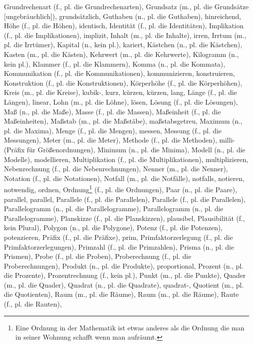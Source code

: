 Grundrechenart (f., pl. die Grundrechenarten),
Grundsatz (m., pl. die Grundsätze [ungebräuchlich]),
grundsätzlich,
Guthaben (n., pl. die Guthaben),
hinreichend,
Höhe (f., pl. die Höhen),
identisch,
Identität (f., pl. die Identitäten),
Implikation (f., pl. die Implikationen),
implizit,
Inhalt (m., pl. die Inhalte),
irren,
Irrtum (m., pl. die Irrtümer),
Kapital (n., kein pl.),
kariert,
Kästchen (n., pl. die Kästchen),
Kasten (m., pl. die Kästen),
Kehrwert (m., pl. die Kehrwerte),
Kilogramm (n., kein pl.),
Klammer (f., pl. die Klammern),
Komma (n., pl. die Kommata),
Kommunikation (f., pl. die Kommunikationen),
kommunizieren,
konstruieren,
Konstruktion (f., pl. die Konstruktionen),
Körperhöhe (f., pl. die Körperhöhen),
Kreis (m., pl. die Kreise),
kubik-,
kurz,
kürzen,
kürzen,
lang,
Länge (f., pl. die Längen),
linear,
Lohn (m., pl. die Löhne),
lösen,
Lösung (f., pl. die Lösungen),
Maß (n., pl. die Maße),
Masse (f., pl. die Massen),
Maßeinheit (f., pl. die Maßeinheiten),
Maßstab (m., pl. die Maßstäbe),
maßstabsgetreu,
Maximum (n., pl. die Maxima),
Menge (f., pl. die Mengen),
messen,
Messung (f., pl. die Messungen),
Meter (m., pl. die Meter),
Methode (f., pl. die Methoden),
milli- (Präfix für Größenordnungen),
Minimum (n., pl. die Minima),
Modell (n., pl. die Modelle),
modellieren,
Multiplikation (f., pl. die Multiplikationen),
multiplizieren,
Nebenrechnung (f., pl. die Nebenrechnungen),
Nenner (m., pl. die Nenner),
Notation (f., pl. die Notationen),
Notfall (m., pl. die Notfälle),
notfalls,
notieren,
notwendig,
ordnen,
Ordnung\footnote{Eine Ordnung in der Mathematik ist etwas anderes als die Ordnung die man in seiner Wohnung schafft wenn man aufräumt.} (f., pl. die Ordnungen),
Paar (n., pl. die Paare),
parallel,
parallel,
Parallele (f., pl. die Parallelen),
Parallele (f., pl. die Parallelen),
Parallelogramm (n., pl. die Parallelogramme),
Parallelogramm (n., pl. die Parallelogramme),
Planskizze (f., pl. die Planskizzen),
plausibel,
Plausibilität (f., kein Plural),
Polygon (n., pl. die Polygone),
Potenz (f., pl. die Potenzen),
potenzieren,
Präfix (f., pl. die Präfixe),
prim,
Primfaktorzerlegung (f., pl. die Primfaktorzerlegungen),
Primzahl (f., pl. die Primzahlen),
Prisma (n., pl. die Prismen),
Probe (f., pl. die Proben),
Proberechnung (f., pl. die Proberechnungen),
Produkt (n., pl. die Produkte),
proportional,
Prozent (n., pl. die Prozente),
Prozentrechnung (f., kein pl.),
Punkt (m., pl. die Punkte),
Quader (m., pl. die Quader),
Quadrat (n., pl. die Quadrate),
quadrat-,
Quotient (m., pl. die Quotienten),
Raum (m., pl. die Räume),
Raum (m., pl. die Räume),
Raute (f., pl. die Rauten),
